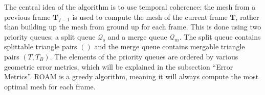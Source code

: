 The central idea of the algorithm is to use temporal coherence: the mesh from a previous frame $\mathbf{T}_{f-1}$ is used to compute 
the mesh of the current frame $\mathbf{T}$, rather than building up the mesh from ground up for each frame.
This is done using two priority queues: a split queue $\mathcal{Q}_s$ and a merge queue $\mathcal{Q}_m$.
The split queue contains splittable triangle pairs $()$
and the merge queue contains mergable triangle pairs $(T,T_B)$.
The elements of the priority queues are ordered by 
various geometric error metrics, which will be explained in the subsection ``Error Metrics''.
ROAM is a greedy algorithm, meaning it will always compute the most optimal mesh for each frame.



